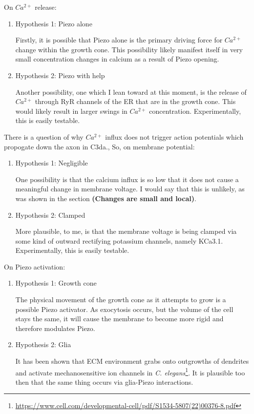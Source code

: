 \documentclass[12pt]{amsart}
\begin{document}
On $Ca^{2+}$ release: 
\begin{enumerate}
    \item Hypothesis 1: Piezo alone

    Firstly, it is possible that Piezo alone is the primary driving force for $Ca^{2+}$ change within the growth cone. This possibility likely manifest itself in very small concentration changes in calcium as a result of Piezo opening. 
    
    \item Hypothesis 2: Piezo with help

    Another possibility, one which I lean toward at this moment, is the release of $Ca^{2+}$ through RyR channels of the ER that are in the growth cone. This would likely result in larger swings in $Ca^{2+}$ concentration. Experimentally, this is easily testable. 
\end{enumerate}

\bigskip

 There is a question of why $Ca^{2+}$ influx does not trigger action potentials which propogate down the axon in C3da., So, on membrane potential: 
\begin{enumerate}
    \item Hypothesis 1: Negligible

   One possibility is that the calcium influx is so low that it does not cause a meaningful change in membrane voltage. I would say that this is unlikely, as was shown in the section \textbf{(Changes are small and local)}. 
    
    \item Hypothesis 2: Clamped

    More plausible, to me, is that the membrane voltage is being clamped via some kind of outward rectifying potassium channels, namely KCa3.1. Experimentally, this is easily testable. 
\end{enumerate}

\bigskip

On Piezo activation: 
\begin{enumerate}
    \item Hypothesis 1: Growth cone

   The physical movement of the growth cone as it attempts to grow is a possible Piezo activator. As exocytosis occurs, but the volume of the cell stays the same, it will cause the membrane to become more rigid and therefore modulates Piezo.  
    
    \item Hypothesis 2: Glia

    It has been shown that ECM environment grabs onto outgrowths of dendrites and activate mechanosensitive ion channels in \textit{C. elegans}\footnote{\url{https://www.cell.com/developmental-cell/pdf/S1534-5807(22)00376-8.pdf}}. It is plausible too then that the same thing occurs via glia-Piezo interactions. 
\end{enumerate}
\end{document}
